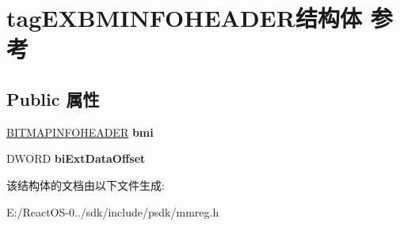 \hypertarget{structtag_e_x_b_m_i_n_f_o_h_e_a_d_e_r}{}\section{tag\+E\+X\+B\+M\+I\+N\+F\+O\+H\+E\+A\+D\+E\+R结构体 参考}
\label{structtag_e_x_b_m_i_n_f_o_h_e_a_d_e_r}
\subsection*{Public 属性}
\begin{DoxyCompactItemize}
\item 
\mbox{\label{structtag_e_x_b_m_i_n_f_o_h_e_a_d_e_r_a5f8956d8630fc000b48242f7670c37cb}} 
\hyperlink{struct_b_i_t_m_a_p_i_n_f_o_h_e_a_d_e_r}{B\+I\+T\+M\+A\+P\+I\+N\+F\+O\+H\+E\+A\+D\+ER} {\bfseries bmi}
\item 
\mbox{\label{structtag_e_x_b_m_i_n_f_o_h_e_a_d_e_r_a9447e9ce3f1cac2a6dd60eeb85bb3d73}} 
D\+W\+O\+RD {\bfseries bi\+Ext\+Data\+Offset}
\end{DoxyCompactItemize}


该结构体的文档由以下文件生成\+:\begin{DoxyCompactItemize}
\item 
E\+:/\+React\+O\+S-\/0../sdk/include/psdk/mmreg.\+h\end{DoxyCompactItemize}
